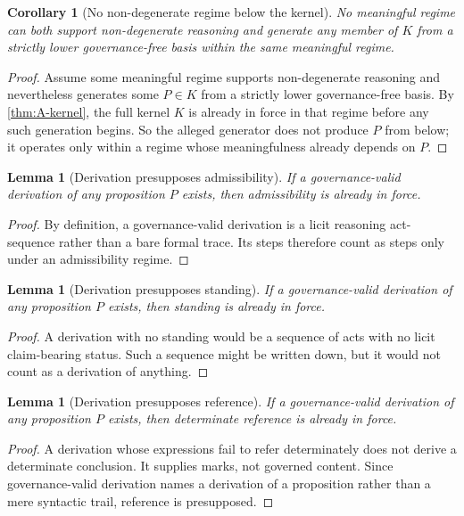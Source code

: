 \documentclass[11pt]{article}
\theoremstyle{plain}
\newtheorem{lemma}[theorem]{Lemma}
\newtheorem{corollary}[theorem]{Corollary}
\theoremstyle{definition}
\begin{document}
\begin{corollary}[No non-degenerate regime below the kernel]
\label{cor:A-no-below-kernel}
No meaningful regime can both support non-degenerate reasoning and generate any member of $K$ from a strictly lower governance-free basis within the same meaningful regime.
\end{corollary}

\begin{proof}
Assume some meaningful regime supports non-degenerate reasoning and nevertheless generates some $P\in K$ from a strictly lower governance-free basis. By \cref{thm:A-kernel}, the full kernel $K$ is already in force in that regime before any such generation begins. So the alleged generator does not produce $P$ from below; it operates only within a regime whose meaningfulness already depends on $P$.
\end{proof}

\begin{lemma}[Derivation presupposes admissibility]
\label{lem:A-der-adm}
If a governance-valid derivation of any proposition $P$ exists, then admissibility is already in force.
\end{lemma}

\begin{proof}
By definition, a governance-valid derivation is a licit reasoning act-sequence rather than a bare formal trace. Its steps therefore count as steps only under an admissibility regime.
\end{proof}

\begin{lemma}[Derivation presupposes standing]
\label{lem:A-der-stand}
If a governance-valid derivation of any proposition $P$ exists, then standing is already in force.
\end{lemma}

\begin{proof}
A derivation with no standing would be a sequence of acts with no licit claim-bearing status. Such a sequence might be written down, but it would not count as a derivation of anything.
\end{proof}

\begin{lemma}[Derivation presupposes reference]
\label{lem:A-der-ref}
If a governance-valid derivation of any proposition $P$ exists, then determinate reference is already in force.
\end{lemma}

\begin{proof}
A derivation whose expressions fail to refer determinately does not derive a determinate conclusion. It supplies marks, not governed content. Since governance-valid derivation names a derivation of a proposition rather than a mere syntactic trail, reference is presupposed.
\end{proof}
\end{document}
